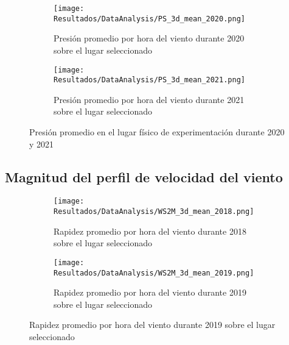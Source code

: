 			\begin{figure}[H]
				\centering
				\begin{subfigure}[t]{0.45\linewidth}
					\centering
					\texttt{[image: Resultados/DataAnalysis/PS\_3d\_mean\_2020.png]}
					\caption{Presión promedio por hora del viento durante 2020 sobre el lugar seleccionado}
					\label{fig:PS_3d_mean_2020}
				\end{subfigure}
				\hfill
				\begin{subfigure}[t]{0.45\linewidth}
					\centering
					\texttt{[image: Resultados/DataAnalysis/PS\_3d\_mean\_2021.png]}
					\caption{Presión promedio por hora del viento durante 2021 sobre el lugar seleccionado}
					\label{fig:PS_3d_mean_2021}
				\end{subfigure}
				\caption{Presión promedio en el lugar físico de experimentación durante 2020 y 2021}
				\label{fig:PS_3d_mean}
			\end{figure}
			
		\subsection{Magnitud del perfil de velocidad del viento}
			
			\begin{figure}[H]
				\centering
				\begin{subfigure}[t]{0.45\linewidth}
					\centering
					\texttt{[image: Resultados/DataAnalysis/WS2M\_3d\_mean\_2018.png]}
					\caption{Rapidez promedio por hora del viento durante 2018 sobre el lugar seleccionado}
					\label{fig:WS2M_3d_mean_2018}
				\end{subfigure}
				\hfill
				\begin{subfigure}[t]{0.45\linewidth}
					\centering
					\texttt{[image: Resultados/DataAnalysis/WS2M\_3d\_mean\_2019.png]}
					\caption{Rapidez promedio por hora del viento durante 2019 sobre el lugar seleccionado}
					\label{fig:WS2M_3d_mean_2019}
				\end{subfigure}
			\end{figure}
			
